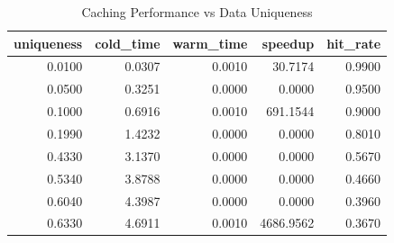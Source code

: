 \begin{table}[htbp]
\centering
\caption{Caching Performance vs Data Uniqueness}
\label{tab:cache_perf}
\begin{tabular}{rrrrr}
\toprule
uniqueness & cold_time & warm_time & speedup & hit_rate \\
\midrule
0.0100 & 0.0307 & 0.0010 & 30.7174 & 0.9900 \\
0.0500 & 0.3251 & 0.0000 & 0.0000 & 0.9500 \\
0.1000 & 0.6916 & 0.0010 & 691.1544 & 0.9000 \\
0.1990 & 1.4232 & 0.0000 & 0.0000 & 0.8010 \\
0.4330 & 3.1370 & 0.0000 & 0.0000 & 0.5670 \\
0.5340 & 3.8788 & 0.0000 & 0.0000 & 0.4660 \\
0.6040 & 4.3987 & 0.0000 & 0.0000 & 0.3960 \\
0.6330 & 4.6911 & 0.0010 & 4686.9562 & 0.3670 \\
\bottomrule
\end{tabular}
\end{table}
